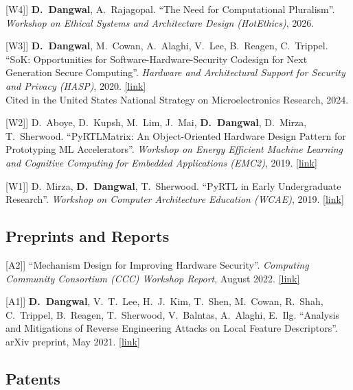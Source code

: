 \documentclass[11pt,letterpaper]{article}
\newcommand{\me}{\textbf{D.~Dangwal}}
\newcommand{\note}[1]{\\ \textcolor{noteRed}{#1}}
\newcommand{\pubtarget}[1]{\raisebox{\baselineskip}[0pt][0pt]{\hypertarget{pub:#1}{}}[#1]}
\newcommand{\paperlink}[1]{\href{#1}{[link]}}
\begin{document}
\begin{publist}
\item[\pubtarget{W4}] \me, A.~Rajagopal. ``The Need for Computational Pluralism''. \emph{Workshop on Ethical Systems and Architecture Design (HotEthics)}, 2026.
\item[\pubtarget{W3}] \me, M.~Cowan, A.~Alaghi, V.~Lee, B.~Reagen, C.~Trippel. ``SoK: Opportunities for Software-Hardware-Security Codesign for Next Generation Secure Computing''. \emph{Hardware and Architectural Support for Security and Privacy (HASP)}, 2020. \paperlink{https://arxiv.org/pdf/2105.00378}
  \note{Cited in the United States National Strategy on Microelectronics Research, 2024.}
\item[\pubtarget{W2}] D.~Aboye, D.~Kupsh, M.~Lim, J.~Mai, \me, D.~Mirza, T.~Sherwood. ``PyRTLMatrix: An Object-Oriented Hardware Design Pattern for Prototyping ML Accelerators''. \emph{Workshop on Energy Efficient Machine Learning and Cognitive Computing for Embedded Applications (EMC2)}, 2019. \paperlink{https://sites.cs.ucsb.edu/~sherwood/pubs/EMC2-19-pyrtl-matrix.pdf}
\item[\pubtarget{W1}] D.~Mirza, \me, T.~Sherwood. ``PyRTL in Early Undergraduate Research''. \emph{Workshop on Computer Architecture Education (WCAE)}, 2019. \paperlink{https://dl.acm.org/doi/10.1145/3338698.3338890}
\end{publist}

\subsection{Preprints and Reports}

\begin{publist}
\item[\pubtarget{A2}] ``Mechanism Design for Improving Hardware Security''. \emph{Computing Community Consortium (CCC) Workshop Report}, August 2022. \paperlink{https://cra.org/ccc/wp-content/uploads/sites/2/2023/04/01378-Mechanism-Design-Workshop-Report.pdf}
\item[\pubtarget{A1}] \me, V.~T.~Lee, H.~J.~Kim, T.~Shen, M.~Cowan, R.~Shah, C.~Trippel, B.~Reagen, T.~Sherwood, V.~Balntas, A.~Alaghi, E.~Ilg. ``Analysis and Mitigations of Reverse Engineering Attacks on Local Feature Descriptors''. arXiv preprint, May 2021. \paperlink{https://arxiv.org/abs/2105.03812}
\end{publist}

\subsection{Patents}
\end{document}
